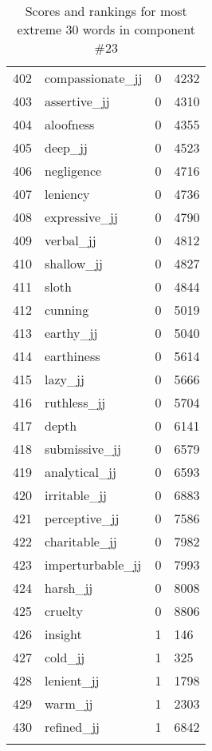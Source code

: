 \begin{longtable}[!htbp]{| rlr@{.}l |}
    402 & compassionate\_jj & 0 & 4232 \\
    403 & assertive\_jj & 0 & 4310 \\
    404 & aloofness & 0 & 4355 \\
    405 & deep\_jj & 0 & 4523 \\
    406 & negligence & 0 & 4716 \\
    407 & leniency & 0 & 4736 \\
    408 & expressive\_jj & 0 & 4790 \\
    409 & verbal\_jj & 0 & 4812 \\
    410 & shallow\_jj & 0 & 4827 \\
    411 & sloth & 0 & 4844 \\
    412 & cunning & 0 & 5019 \\
    413 & earthy\_jj & 0 & 5040 \\
    414 & earthiness & 0 & 5614 \\
    415 & lazy\_jj & 0 & 5666 \\
    416 & ruthless\_jj & 0 & 5704 \\
    417 & depth & 0 & 6141 \\
    418 & submissive\_jj & 0 & 6579 \\
    419 & analytical\_jj & 0 & 6593 \\
    420 & irritable\_jj & 0 & 6883 \\
    421 & perceptive\_jj & 0 & 7586 \\
    422 & charitable\_jj & 0 & 7982 \\
    423 & imperturbable\_jj & 0 & 7993 \\
    424 & harsh\_jj & 0 & 8008 \\
    425 & cruelty & 0 & 8806 \\
    426 & insight & 1 & 146 \\
    427 & cold\_jj & 1 & 325 \\
    428 & lenient\_jj & 1 & 1798 \\
    429 & warm\_jj & 1 & 2303 \\
    430 & refined\_jj & 1 & 6842 \\
    \hline
    \caption{Scores and rankings for most extreme 30 words in component \#23} \\
\end{longtable}
